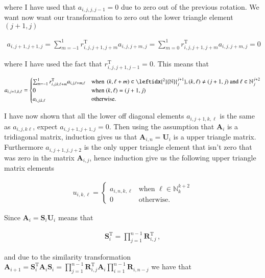 \documentclass[11pt,english,a4paper]{article}
\begin{document}
\begin{flushleft}
where I have used that $a_{i,j,j,j-1}=0$ due to zero out of the previous rotation. We want now want our transformation to zero out the lower triangle element $(j+1,j)$

\begin{align*}
a_{i,j+1,j+1,j} = \sum_{m=-1}^1 r_{i,j,j+1,j+m}^{\text{T}} a_{i,j,j+m,j} = \sum_{m=0}^1 r_{i,j,j+1,j+m}^{\text{T}} a_{i,j,j+m,j} = 0
\end{align*}

where I have used the fact that $r_{i,j,j+1,j-1}^{\text{T}} = 0$. This means that

\begin{align*}
a_{i,j+1,k,\ell} = \begin{cases} \sum_{m=-1}^1 r_{i,j,k,\ell+m}^{\text{T}} a_{i,j,\ell+m,\ell} & \text{when } \p{k,\ell+m}\in{\leftidx{^2}{\mathbb{N}}{_j^{j+1}}}, (k,\ell)\neq (j+1,j) \text{ and } \ell \in\mathbb{N}_{j}^{j+2}\\ 0 & \text{when } (k,\ell)=(j+1,j) \\ a_{i,j,k,\ell} & \text{otherwise.}\end{cases} 
\end{align*}

I have now shown that all the lower off diagonal elements $a_{i,j+1,k,\ell}$ is the same as $a_{i,j,k\ell}$, expect $a_{i,j+1,j+1,j}=0$. Then using the assumption that $\textbf{A}_i$ is a tridiagonal matrix, induction gives us that $\textbf{A}_{i,n} = \textbf{U}_i$ is a upper triangle matrix. Furthermore $a_{i,j+1,j,j+2}$ is the only upper triangle element that isn't zero that was zero in the matrix $\textbf{A}_{i,j}$, hence induction give us the following upper triangle matrix elements

\begin{align*}
u_{i,k,\ell} = \begin{cases} a_{i,n,k,\ell} & \text{when } \ell\in\mathbb{N}_k^{k+2} \\ 0 & \text{otherwise.} \end{cases}
\end{align*}

Since $\textbf{A}_i = \textbf{S}_i \textbf{U}_i$ means that 

\begin{align*}
\textbf{S}_i^{\text{T}} = \prod_{j=1}^{n-1} \textbf{R}_{i,j}^{\text{T}} \,,
\end{align*}

and due to the similarity transformation $\textbf{A}_{i+1} = \textbf{S}_i^{\text{T}} \textbf{A}_i \textbf{S}_i = \prod_{j=1}^{n-1}\textbf{R}_{i,j}^{\text{T}} \textbf{A}_i \prod_{i=1}^{n-1}\textbf{R}_{i,n-j}$ we have that


\end{flushleft}
\end{document}
